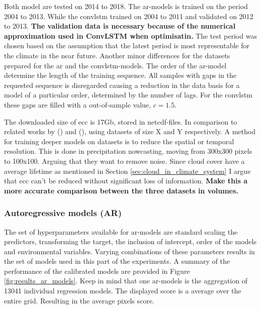 Both model are tested on 2014 to 2018. The \acrshort{ar}-models is trained on the period 2004 to 2013. While the \acrshort{convlstm} trained on  2004 to 2011 and validated on 2012 to 2013. \textbf{The validation data is necessary because of the numerical approximation used in ConvLSTM when optimisatin.} The test period was chosen based on the assumption that the latest period is most representable for the climate in the near future. Another minor differences for the datasets prepared for the \acrshort{ar} and the \acrshort{convlstm}-models. The order of the \acrshort{ar}-model determine the length of the training sequence. All samples with gaps in the requested sequence is disregarded causing a reduction in the data basis for a model of a particular order, determined by the number of lags. For the \acrshort{convlstm} these gaps are filled with a out-of-sample value, $c=1.5$. 

The downloaded size of \acrshort{ecc} is 17Gb, stored in \acrshort{netcdf}-files. 
In comparison to related works by \citeauthor{precip_nowcasting} (\citeyear{precip_nowcasting}) and \citeauthor{SunAirLSTM} (\citeyear{SunAirLSTM}), using datasets of size X and Y respectively. A method for training deeper models on datasets is to reduce the spatial or temporal resolution. This is done in precipitation nowcasting, moving from 300x300 pixels to 100x100. Arguing that they want to remove noise. Since cloud cover have a average lifetime as mentioned in Section \ref{sec:cloud_in_climate_system} I argue that \acrshort{ecc} can't be reduced without significant loss of information. \textbf{Make this a more accurate comparison between the three datasets in volumes.}

\subsubsection{Autoregressive models (AR)}
The set of hyperparameters available for \acrshort{ar}-models are
standard scaling the predictors, transforming the target, the inclusion of intercept, order of the models and environmental variables. Varying combinations of these parameters results in the set of models used in this part of the experiments. A summary of the performance of the calibrated models are provided in Figure \ref{fig:results_ar_models}. Keep in mind that one \acrshort{ar}-models is the aggregation of 13041 individual regression models. The displayed score is a average over the entire grid. Resulting in the average pixels score.

